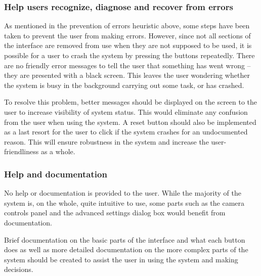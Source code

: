 \subsubsection{Help users recognize, diagnose and recover from errors}
As mentioned in the prevention of errors heuristic above, some steps have been taken to prevent the user from making errors. However, since not all sections of the interface are removed from use when they are not supposed to be used, it is possible for a user to crash the system by pressing the buttons repeatedly. There are no friendly error messages to tell the user that something has went wrong -- they are presented with a black screen. This leaves the user wondering whether the system is busy in the background carrying out some task, or has crashed.

To resolve this problem, better messages should be displayed on the screen to the user to increase visibility of system status. This would eliminate any confusion from the user when using the system. A reset button should also be implemented as a last resort for the user to click if the system crashes for an undocumented reason. This will ensure robustness in the system and increase the user-friendliness as a whole.

\subsubsection{Help and documentation}
No help or documentation is provided to the user. While the majority of the system is, on the whole, quite intuitive to use, some parts such as the camera controls panel and the advanced settings dialog box would benefit from documentation.

Brief documentation on the basic parts of the interface and what each button does as well as more detailed documentation on the more complex parts of the system should be created to assist the user in using the system and making decisions.

